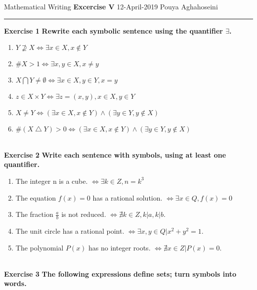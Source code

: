 \documentclass{article}
\begin{document}
\noindent
Mathematical Writing \hfill \textbf{Excercise V} \newline 
{12-April-2019} \hfill Pouya Aghahoseini

\noindent
\rule{\linewidth}{0.4pt}
\textbf{\large\color{blue} Exercise 1}   \textbf{Rewrite each symbolic sentence using the quantifier $\exists$.}

	\begin{enumerate}
		\item $Y \nsupseteq X \Leftrightarrow \exists x \in X, x \notin Y $
		\item $ \# X>1 \Leftrightarrow \exists x,y \in X, x \neq y $
		\item $ X \bigcap Y \neq \emptyset \Leftrightarrow \exists x \in X,y \in Y, x=y $
		\item $ z \in X \times Y \Leftrightarrow \exists z =(x,y) , x\in X,y \in Y $
		\item $ X \neq Y \Leftrightarrow (\exists x\in X, x \notin Y) \wedge (\exists y\in Y, y \notin X) $
		\item $ \# (X \bigtriangleup Y)>0 \Leftrightarrow (\exists x\in X, x \notin Y) \wedge (\exists y\in Y, y \notin X) $
	\end{enumerate}
	
\text{}\\
\textbf{\large\color{blue} Exercise 2} \textbf{Write each sentence with symbols, using at least one quantifier.}

\begin{enumerate}
	\item 
	The integer n is a cube. $ \Leftrightarrow \exists k \in Z, n=k^{3} $
	\item 
	The equation $f(x)=0$ has a rational solution. $ \Leftrightarrow \exists x \in Q, f(x)=0 $
	\item 
	The fraction $\frac{a}{b}$ is not reduced. $ \Leftrightarrow \nexists k \in Z, k|a , k|b$.
	\item 
	The unit circle has a rational point. $ \Leftrightarrow \exists x,y \in Q | x^{2} + y^{2} = 1$.
	\item 
	The polynomial $P(x)$ has no integer roots. $ \Leftrightarrow \nexists x \in Z | P(x) = 0 $.
\end{enumerate}
\text{}\\
\textbf{\large\color{blue} Exercise 3} \textbf{The following expressions define sets; turn symbols
	into words.}
\end{document}
